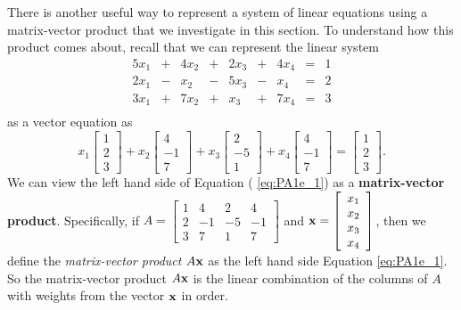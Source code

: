 
There is another useful way to represent a system of linear equations using a matrix-vector product that we investigate in this section. To understand how this product comes about, recall that we can represent the linear system 
\begin{alignat*}{5}
x_1 		&{}+{} 	&{4}x_2 	&{}+{}	&{2}x_3 	&{}+{}	&{4}x_4	&{}={}	&1 \\
{2}x_1 	&{}-{} 	&{}x_2 		&{}-{}	&{5}x_3 	&{}-{}	&{}x_4	&{}={}	&2 \\
{3}x_1 	&{}+{} 	&{7}x_2 	&{}+{}	&{}x_3 		&{}+{}	&{7}x_4	&{}={}	&3 \\
\end{alignat*}
as a vector equation as
\begin{equation} \label{eq:PA1e_1}
x_1\left[ \begin{array}{c} 1\\2\\3 \end{array} \right] + x_2\left[ \begin{array}{r} 4\\-1\\7 \end{array} \right] + x_3\left[ \begin{array}{r} 2\\-5\\1 \end{array} \right] + x_4\left[ \begin{array}{r} 4\\-1\\7 \end{array} \right]= \left[ \begin{array}{c} 1\\2\\3 \end{array} \right].
\end{equation}
We can view the left hand side of Equation ( \ref{eq:PA1e_1}) as a \textbf{matrix-vector product}. Specifically, if $A = \left[ \begin{array}{crrr} 1&4&2&4 \\ 2&-1&-5&-1 \\ 3&7&1&7 \end{array} \right]$ and $\mathbf{x} = \left[ \begin{array}{c} x_1 \\x_2 \\x_3 \\x_4 \end{array} \right]$, then we define the \emph{matrix-vector product} $A\mathbf{x}$ as the left hand side Equation \eqref{eq:PA1e_1}. So the matrix-vector product $A\mathbf{x}$ is the linear combination of the columns of $A$ with weights from the vector $\mathbf{x}$ in order. 

